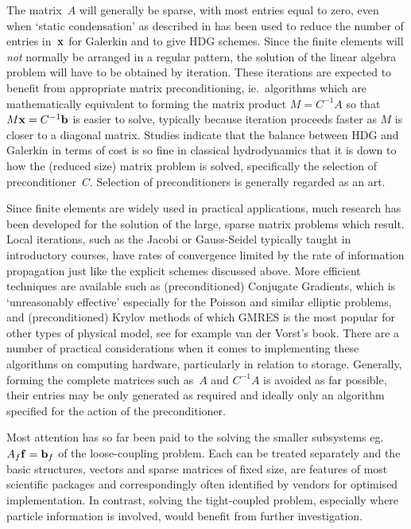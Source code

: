 The matrix~$A$ will generally
be sparse, with most entries equal to zero, even when `static condensation'
as described in  has been used to reduce the number of entries in~${\bf x}$
for Galerkin and to give HDG schemes. Since the finite elements will \emph{not} normally
be arranged in a regular pattern, the solution of the linear algebra
problem will have to be obtained by iteration.
These iterations are expected to benefit from appropriate matrix preconditioning, ie.\
algorithms which are mathematically equivalent to forming the 
matrix product $M=C^{-1}A$ so that $M{\bf x}=C^{-1}{\bf b}$ is easier to solve,
typically because iteration proceeds faster as $M$ is closer to a diagonal matrix.
Studies indicate that the balance between HDG and Galerkin
in terms of cost is so fine in classical hydrodynamics
that it is down to how the (reduced size) matrix problem is solved,
specifically the selection of preconditioner~$C$. %
Selection of preconditioners is generally regarded as an art.

Since finite elements are widely used in practical applications, much
research has been developed for the solution of the large, sparse
matrix problems which result. Local iterations, such as the Jacobi or Gauss-Seidel
typically taught in introductory courses, have rates of convergence limited
by the rate of information propagation just like the explicit schemes discussed above.
More efficient techniques are available such as (preconditioned) Conjugate Gradients,
which is `unreasonably effective' especially for the Poisson and similar
elliptic problems, and (preconditioned) Krylov methods of which GMRES is the
most popular for other types of physical model, see for example
van der Vorst's book. %
There are a number of practical considerations when it comes to implementing
these algorithms on computing hardware, particularly in relation to 
storage. Generally, forming the complete matrices such as~$A$ and $C^{-1}A$
is avoided as far possible, their entries may be only generated as required
and ideally only an algorithm specified for the action of the preconditioner.

Most attention has so far been paid to the solving the smaller subsystems
eg.\ $A_f {\bf f}= {\bf b}_f$ of the loose-coupling problem. Each can be
treated separately and the basic structures, vectors and sparse matrices of fixed size,
are features of most scientific packages and correspondingly often identified
by vendors for optimised implementation. In contrast,
solving the tight-coupled problem, especially where particle information is
involved, would benefit from further investigation.







